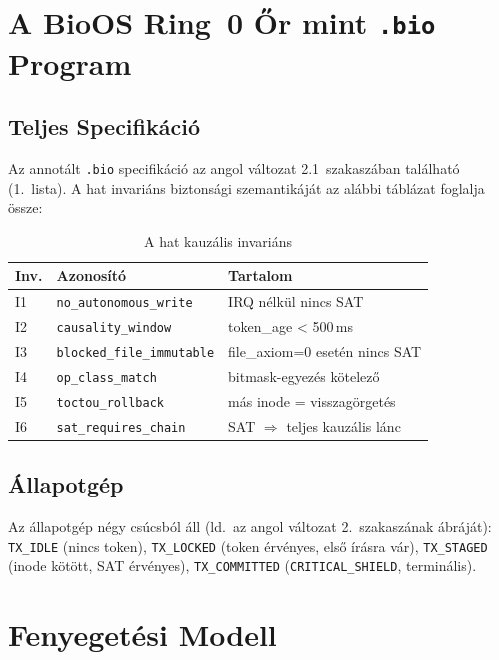 \documentclass[11pt,a4paper,twoside]{article}
\newcommand{\tm}[1]{\texttt{#1}}
\begin{document}
\begin{magyar}
\section{A BioOS Ring~0 Őr mint \texttt{.bio} Program}

\subsection{Teljes Specifikáció}

Az annotált \texttt{.bio} specifikáció az angol változat 2.1~szakaszában
található (1.~lista). A hat invariáns biztonsági szemantikáját az alábbi
táblázat foglalja össze:

\begin{table}[H]
\centering
\caption{A hat kauzális invariáns}
\begin{tabular}{@{}llp{6cm}@{}}
\toprule
\textbf{Inv.} & \textbf{Azonosító} & \textbf{Tartalom} \\ \midrule
I1 & \texttt{no\_autonomous\_write}   & IRQ nélkül nincs SAT \\
I2 & \texttt{causality\_window}       & token\_age < 500\,ms \\
I3 & \texttt{blocked\_file\_immutable}& file\_axiom=0 esetén nincs SAT \\
I4 & \texttt{op\_class\_match}        & bitmask-egyezés kötelező \\
I5 & \texttt{toctou\_rollback}        & más inode = visszagörgetés \\
I6 & \texttt{sat\_requires\_chain}    & SAT $\Rightarrow$ teljes kauzális lánc \\
\bottomrule
\end{tabular}
\end{table}

\subsection{Állapotgép}

Az állapotgép négy csúcsból áll (ld.\ az angol változat 2.~szakaszának ábráját):
\texttt{TX\_IDLE} (nincs token),
\texttt{TX\_LOCKED} (token érvényes, első írásra vár),
\texttt{TX\_STAGED} (inode kötött, SAT érvényes),
\texttt{TX\_COMMITTED} (\tm{CRITICAL\_SHIELD}, terminális).

\section{Fenyegetési Modell}


\end{magyar}
\end{document}
